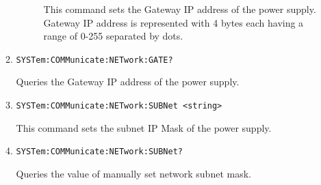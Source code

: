 \documentclass[a4paper,10pt]{article}
\begin{document}
\begin{enumerate}
\begin{enumerate}
\begin{description}
		        This command sets the Gateway IP address of the power supply. Gateway IP address is represented with 4 bytes each having a range of 0-255 separated by dots.
		    \end{description}
		\item 
		    \begin{verbatim}SYSTem:COMMunicate:NETwork:GATE?\end{verbatim}
		    \begin{description}
		        Queries the Gateway IP address of the power supply.
	        \end{description}
	    \item 
	        \begin{verbatim}SYSTem:COMMunicate:NETwork:SUBNet <string>\end{verbatim}
	        \begin{description}
	            This command sets the subnet IP Mask of the power supply.
	        \end{description}
	    \item 
	        \begin{verbatim}SYSTem:COMMunicate:NETwork:SUBNet?\end{verbatim}
	        \begin{description}
		        Queries the value of manually set network subnet mask.
		    \end{description}

\end{enumerate}
\end{enumerate}
\end{document}
